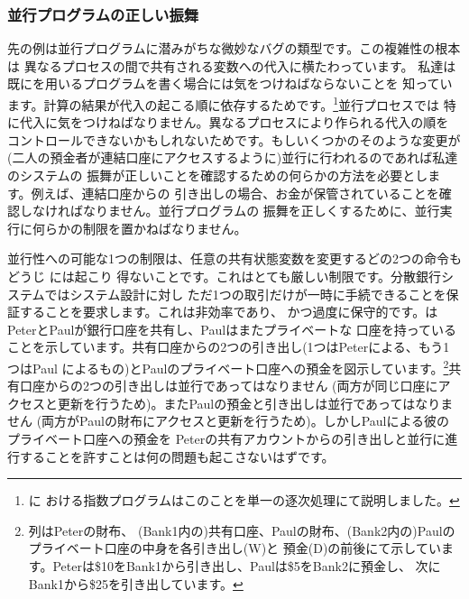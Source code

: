 \subsubsection*{並行プログラムの正しい振舞}



先の例は並行プログラムに潜みがちな微妙なバグの類型です。この複雑性の根本は
異なるプロセスの間で共有される変数への代入に横たわっています。
私達は既にを用いるプログラムを書く場合には気をつけねばならないことを
知っています。計算の結果が代入の起こる順に依存するためです。\footnote{に
おける指数プログラムはこのことを単一の逐次処理にて説明しました。}並行プロセスでは
特に代入に気をつけねばなりません。異なるプロセスにより作られる代入の順を
コントロールできないかもしれないためです。もしいくつかのそのような変更が
(二人の預金者が連結口座にアクセスするように)並行に行われるのであれば私達のシステムの
振舞が正しいことを確認するための何らかの方法を必要とします。例えば、連結口座からの
引き出しの場合、お金が保管されていることを確認しなければなりません。並行プログラムの
振舞を正しくするために、並行実行に何らかの制限を置かねばなりません。



並行性への可能な1つの制限は、任意の共有状態変数を変更するどの2つの命令もどうじ には起こり
得ないことです。これはとても厳しい制限です。分散銀行システムではシステム設計に対し
ただ1つの取引だけが一時に手続できることを保証することを要求します。これは非効率であり、
かつ過度に保守的です。はPeterとPaulが銀行口座を共有し、Paulはまたプライベートな
口座を持っていることを示しています。共有口座からの2つの引き出し(1つはPeterによる、もう1つはPaul
によるもの)とPaulのプライベート口座への預金を図示しています。\footnote{列はPeterの財布、
(Bank1内の)共有口座、Paulの財布、(Bank2内の)Paulのプライベート口座の中身を各引き出し(W)と
預金(D)の前後にて示しています。Peterは\$10をBank1から引き出し、Paulは\$5をBank2に預金し、
次にBank1から\$25を引き出しています。}共有口座からの2つの引き出しは並行であってはなりません
(両方が同じ口座にアクセスと更新を行うため)。またPaulの預金と引き出しは並行であってはなりません
(両方がPaulの財布にアクセスと更新を行うため)。しかしPaulによる彼のプライベート口座への預金を
Peterの共有アカウントからの引き出しと並行に進行することを許すことは何の問題も起こさないはずです。


